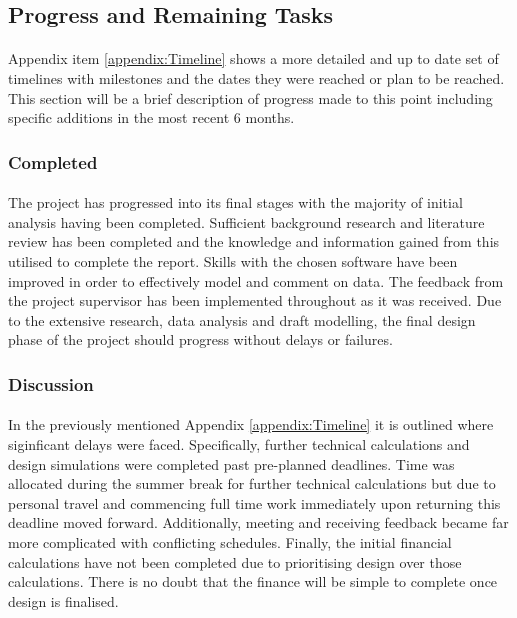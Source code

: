 \subsection{Progress and Remaining Tasks}

\paragraph{}
Appendix item \ref{appendix:Timeline} shows a more detailed and up to date set of timelines with milestones and the dates they were reached or plan to be reached. This section will be a brief description of progress made to this point including specific additions in the most recent 6 months. 

\subsubsection{Completed}

\paragraph{}
The project has progressed into its final stages with the majority of initial analysis having been completed. Sufficient background research and literature review has been completed and the knowledge and information gained from this utilised to complete the report. Skills with the chosen software have been improved in order to effectively model and comment on data. The feedback from the project supervisor has been implemented throughout as it was received. Due to the extensive research, data analysis and draft modelling, the final design phase of the project should progress without delays or failures. 

\subsubsection{Discussion}

\paragraph{}
In the previously mentioned Appendix \ref{appendix:Timeline} it is outlined where siginficant delays were faced. Specifically, further technical calculations and design simulations were completed past pre-planned deadlines. Time was allocated during the summer break for further technical calculations but due to personal travel and commencing full time work immediately upon returning this deadline moved forward. Additionally, meeting and receiving feedback became far more complicated with conflicting schedules. Finally, the initial financial calculations have not been completed due to prioritising design over those calculations. There is no doubt that the finance will be simple to complete once design is finalised. 

